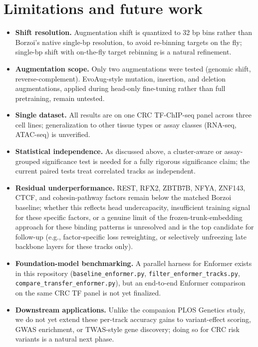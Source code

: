 \documentclass[10pt]{article}
\begin{document}
\section*{Limitations and future work}
\begin{itemize}
\item \textbf{Shift resolution.} Augmentation shift is quantized to 32 bp bins rather than Borzoi's native single-bp resolution, to avoid re-binning targets on the fly; single-bp shift with on-the-fly target rebinning is a natural refinement.
\item \textbf{Augmentation scope.} Only two augmentations were tested (genomic shift, reverse-complement). EvoAug-style mutation, insertion, and deletion augmentations, applied during head-only fine-tuning rather than full pretraining, remain untested.
\item \textbf{Single dataset.} All results are on one CRC TF-ChIP-seq panel across three cell lines; generalization to other tissue types or assay classes (RNA-seq, ATAC-seq) is unverified.
\item \textbf{Statistical independence.} As discussed above, a cluster-aware or assay-grouped significance test is needed for a fully rigorous significance claim; the current paired tests treat correlated tracks as independent.
\item \textbf{Residual underperformance.} REST, RFX2, ZBTB7B, NFYA, ZNF143, CTCF, and cohesin-pathway factors remain below the matched Borzoi baseline; whether this reflects head undercapacity, insufficient training signal for these specific factors, or a genuine limit of the frozen-trunk-embedding approach for these binding patterns is unresolved and is the top candidate for follow-up (e.g., factor-specific loss reweighting, or selectively unfreezing late backbone layers for these tracks only).
\item \textbf{Foundation-model benchmarking.} A parallel harness for Enformer exists in this repository (\texttt{baseline\_enformer.py}, \texttt{filter\_enformer\_tracks.py}, \texttt{compare\_transfer\_enformer.py}), but an end-to-end Enformer comparison on the same CRC TF panel is not yet finalized.
\item \textbf{Downstream applications.} Unlike the companion PLOS Genetics study, we do not yet extend these per-track accuracy gains to variant-effect scoring, GWAS enrichment, or TWAS-style gene discovery; doing so for CRC risk variants is a natural next phase.
\end{itemize}
\end{document}
